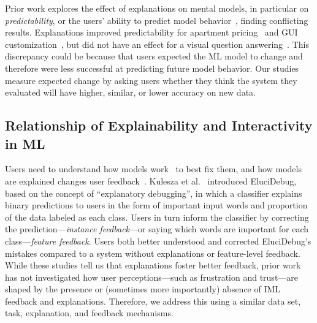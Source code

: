Prior work explores the effect of explanations on mental models, in
particular on \textit{predictability}, or the users' ability to
predict model
behavior~\cite{Poursabzi-Sangdeh2018ManipulatingInterpretability,
Chandrasekaran2019DoHuman, Bunt2007UnderstandingCustomization},
finding conflicting results. Explanations improved predictability for apartment pricing~\cite{Poursabzi-Sangdeh2018ManipulatingInterpretability} and GUI customization~\cite{Bunt2007UnderstandingCustomization}, but did not have an effect for a visual question answering~\cite{Chandrasekaran2019DoHuman}.
%
This discrepancy could be because that users expected the ML model to change and therefore were less successful at predicting future model behavior.
%
Our studies measure expected change by asking
users whether they think the system they evaluated will have higher, similar, or lower accuracy on new data.

\subsection{Relationship of Explainability and Interactivity in ML}

Users need to understand how models work~\cite{Fiebrink2009ALearning, Amershi2010ExaminingLearning, Kulesza2012TellAgent} to best fix
them, and how models are explained changes user
feedback~\cite{Rosenthal2010TowardsData,
Kulesza2015PrinciplesLearning}.
%
%
Kulesza et al.~\cite{Kulesza2015PrinciplesLearning} introduced EluciDebug, based on the concept of
``explanatory debugging'', in which a classifier
explains binary predictions to users in the form of important input
words and proportion of the data labeled as each class.
%
Users in turn inform the classifier by correcting the prediction---\textit{instance feedback}---or saying which words are important for each
class---\textit{feature feedback}.
%
Users both better understood and corrected  EluciDebug's mistakes compared to a system without explanations or feature-level feedback.
%
While these studies tell us that explanations foster better feedback,
prior work has not investigated how user perceptions---such as
frustration and trust---are shaped by the presence or (sometimes more
importantly) absence of IML feedback and explanations. Therefore, we address this using a similar data set, task, explanation, and feedback mechanisms.




